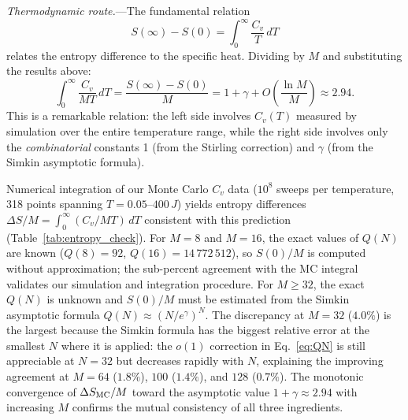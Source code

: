 \documentclass[aps, pre, reprint, amsmath, amssymb, superscriptaddress, floatfix]{revtex4-2}
\begin{document}
\textit{Thermodynamic route.}---The fundamental relation
\begin{equation}
  S(\infty) - S(0) = \int_0^\infty \frac{C_v}{T}\,dT
  \label{eq:thermo_int}
\end{equation}
relates the entropy difference to the specific heat.  Dividing by $M$
and substituting the results above:
\begin{equation}
  \int_0^\infty \frac{C_v}{MT}\,dT
  = \frac{S(\infty) - S(0)}{M}
  = 1 + \gamma + O\!\left(\frac{\ln M}{M}\right)
  \approx 2.94.
  \label{eq:DS}
\end{equation}
This is a remarkable relation: the left side involves $C_v(T)$ measured by simulation over the entire
temperature range, while the right side involves only the
\emph{combinatorial} constants 1 (from the Stirling correction) and
$\gamma$ (from the Simkin asymptotic formula).

Numerical integration of our Monte Carlo $C_v$ data
($10^8$ sweeps per temperature, 318 points spanning $T = 0.05$--$400\,J$)
yields entropy differences $\Delta S/M = \int_0^\infty (C_v/MT)\,dT$
consistent with this prediction (Table~\ref{tab:entropy_check}).
For $M = 8$ and $M = 16$, the exact values of $Q(N)$ are known
($Q(8) = 92$, $Q(16) = 14\,772\,512$), so $S(0)/M$ is computed
without approximation; the sub-percent agreement with the MC integral
validates our simulation and integration procedure.  For $M \ge 32$,
the exact $Q(N)$ is unknown and $S(0)/M$ must be estimated from the
Simkin asymptotic formula $Q(N) \approx (N/e^\gamma)^N$.
The discrepancy at $M = 32$ ($4.0\%$) is the largest because the
Simkin formula has the biggest relative error at the smallest $N$
where it is applied: the $o(1)$ correction in
Eq.~\eqref{eq:QN} is still appreciable at $N = 32$ but
decreases rapidly with $N$, explaining the improving agreement at
$M = 64$ ($1.8\%$), $100$ ($1.4\%$), and $128$ ($0.7\%$).
The monotonic convergence of $\Delta S_{\rm MC}/M$ toward the
asymptotic value $1 + \gamma \approx 2.94$ with increasing $M$
confirms the mutual consistency of all three ingredients.
\end{document}
